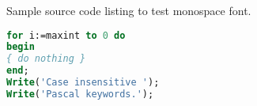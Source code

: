 Sample source code listing to test monospace font.

\begin{lstlisting}[basicstyle=\ttfamily,language=Pascal,frame=single]  % Start your code-block
for i:=maxint to 0 do
begin
{ do nothing }
end;
Write('Case insensitive ');
Write('Pascal keywords.');
\end{lstlisting}